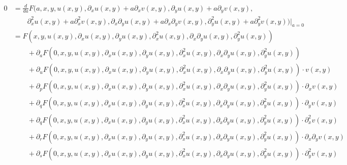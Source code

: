 \begin{align*}
0&=
\frac{d}{da}
F(a,x,y,u(x,y), \partial_xu(x,y)+a\partial_xv(x,y),\partial_yu(x,y)+a\partial_yv(x,y),
\\
&\qquad
\partial_x^2u(x,y)+a\partial_x^2v(x,y),
\partial_x\partial_yu(x,y)+a\partial_x\partial_yv(x,y),
\partial_y^2u(x,y)+a\partial_y^2v(x,y))\bigg|_{a=0}
\\
&=
F(x,y,u(x,y), \partial_xu(x,y),\partial_yu(x,y),
\partial_x^2u(x,y),
\partial_x\partial_yu(x,y),
\partial_y^2u(x,y))
\\
&\qquad+
\partial_a
F(0,x,y,u(x,y), \partial_xu(x,y),\partial_yu(x,y),
\partial_x^2u(x,y),
\partial_x\partial_yu(x,y),
\partial_y^2u(x,y))
\\
&\qquad+
\partial_u
F(0,x,y,u(x,y), \partial_xu(x,y),\partial_yu(x,y),
\partial_x^2u(x,y),
\partial_x\partial_yu(x,y),
\partial_y^2u(x,y))\cdot v(x,y)
\\
&\qquad+
\partial_p
F(0,x,y,u(x,y), \partial_xu(x,y),\partial_yu(x,y),
\partial_x^2u(x,y),
\partial_x\partial_yu(x,y),
\partial_y^2u(x,y))\cdot \partial_xv(x,y)
\\
&\qquad+
\partial_q
F(0,x,y,u(x,y), \partial_xu(x,y),\partial_yu(x,y),
\partial_x^2u(x,y),
\partial_x\partial_yu(x,y),
\partial_y^2u(x,y))\cdot \partial_yv(x,y)
\\
&\qquad+
\partial_q
F(0,x,y,u(x,y), \partial_xu(x,y),\partial_yu(x,y),
\partial_x^2u(x,y),
\partial_x\partial_yu(x,y),
\partial_y^2u(x,y))\cdot \partial_x^2v(x,y)
\\
&\qquad+
\partial_r
F(0,x,y,u(x,y), \partial_xu(x,y),\partial_yu(x,y),
\partial_x^2u(x,y),
\partial_x\partial_yu(x,y),
\partial_y^2u(x,y))\cdot \partial_x\partial_yv(x,y)
\\
&\qquad+
\partial_s
F(0,x,y,u(x,y), \partial_xu(x,y),\partial_yu(x,y),
\partial_x^2u(x,y),
\partial_x\partial_yu(x,y),
\partial_y^2u(x,y))\cdot \partial_y^2v(x,y)
\end{align*}

